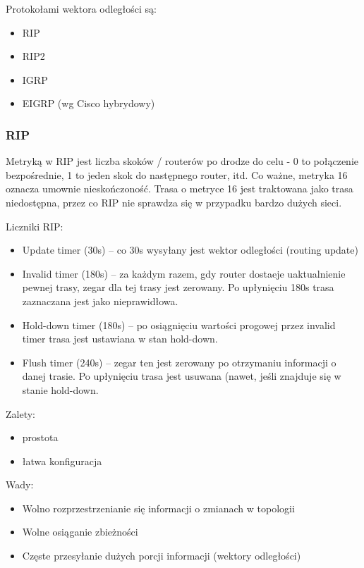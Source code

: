 \documentclass[12pt]{article}
\begin{document}
        Protokołami wektora odległości są:
        \begin{itemize}
            \item RIP
            \item RIP2
            \item IGRP
            \item EIGRP (wg Cisco hybrydowy)
        \end{itemize}

        \subsubsection{RIP}
        Metryką w RIP jest liczba skoków / routerów po drodze do celu - 0 to połączenie bezpośrednie, 1 to jeden skok do następnego router, itd. Co ważne, metryka 16
        oznacza umownie nieskończoność. Trasa o metryce 16 jest traktowana jako trasa niedostępna, przez co RIP nie sprawdza się w przypadku bardzo dużych sieci.

        Liczniki RIP:
        \begin{itemize}
            \item Update timer (30s) – co 30s wysyłany jest wektor odległości (routing update)
            \item Invalid timer (180s) – za każdym razem, gdy router dostaeje uaktualnienie pewnej trasy, zegar dla tej trasy jest zerowany. Po upłynięciu 180s trasa zaznaczana jest jako nieprawidłowa.
            \item Hold-down timer (180s) – po osiągnięciu wartości progowej przez invalid timer trasa jest ustawiana w stan hold-down.
            \item Flush timer (240s) – zegar ten jest zerowany po otrzymaniu informacji o danej trasie. Po upłynięciu trasa jest usuwana (nawet, jeśli znajduje się w stanie hold-down.
        \end{itemize}

        Zalety:
        \begin{itemize}
            \item prostota
            \item łatwa konfiguracja
        \end{itemize}

        Wady:
        \begin{itemize}
            \item Wolno rozprzestrzenianie się informacji o zmianach w topologii
            \item Wolne osiąganie zbieżności
            \item Częste przesyłanie dużych porcji informacji (wektory odległości)
        \end{itemize}
\end{document}
